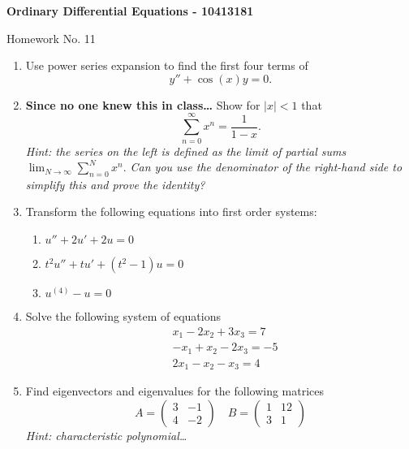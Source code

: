 \documentclass[10pt,a4paper]{letter}
\begin{document}
\begin{center}
\begin{Large}
\textbf{Ordinary Differential Equations - 10413181}\\
\end{Large}
\vspace{1em}
\begin{large}Homework No. 11\end{large}
\end{center}

\begin{enumerate}
\item Use power series expansion to find the first four terms of 
\[ y'' + \cos(x) y = 0. \]
\item \textbf{Since no one knew this in class\ldots} 
Show for $|x|<1$ that 
\[ \sum_{n=0}^\infty x^n = \frac{1}{1-x}. \]
\emph{Hint: the series on the left is defined as the limit of partial sums $\lim_{N\rightarrow \infty} \sum_{n=0}^N x^n.$ Can you use the denominator of the right-hand side to simplify this and prove the identity?}
\item Transform the following equations into first order systems:
\begin{enumerate}
\item $u'' + 2u' + 2u = 0$
\item $t^2 u'' + tu' + (t^2 - 1) u = 0$
\item $u^{(4)} - u = 0$
\end{enumerate}
\item Solve the following system of equations
\begin{align*}
& x_1 - 2x_2 + 3x_3 = 7 \\
& -x_1 + x_2 - 2x_3 = -5 \\
& 2x_1 - x_2 - x_3 = 4
\end{align*}
\item Find eigenvectors and eigenvalues for the following matrices
\[ A = \begin{pmatrix}
3 & -1 \\
4 & -2
\end{pmatrix} \quad 
B = \begin{pmatrix}
1 & 12 \\
3 & 1
\end{pmatrix} \]
\emph{Hint: characteristic polynomial\ldots}
\end{enumerate}
\end{document}
